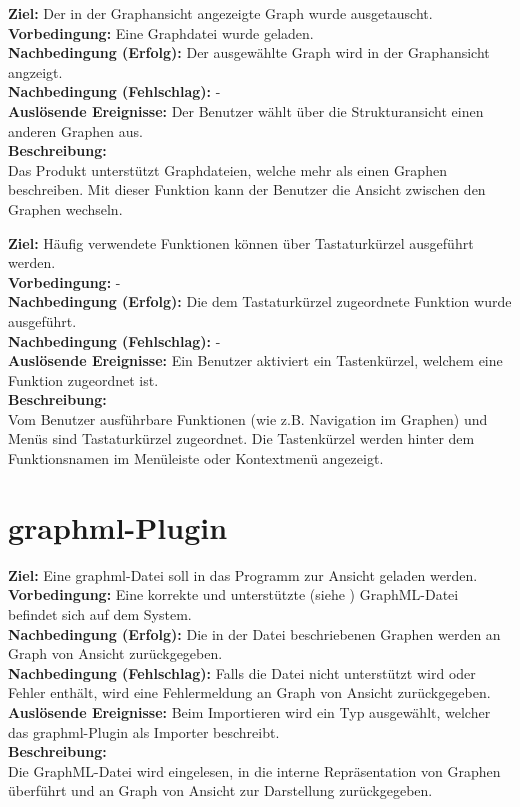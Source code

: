\label{fa:graphwechsel}
\textbf{Ziel:} Der in der Graphansicht angezeigte Graph wurde ausgetauscht. \\
\textbf{Vorbedingung:} Eine Graphdatei wurde geladen.\\
\textbf{Nachbedingung (Erfolg):} Der ausgewählte Graph wird in der Graphansicht angzeigt.\\
\textbf{Nachbedingung (Fehlschlag):} -\\
\textbf{Auslösende Ereignisse:}
Der Benutzer wählt über die Strukturansicht einen anderen Graphen aus.\\
\textbf{Beschreibung:}\\
Das Produkt unterstützt Graphdateien, welche mehr als einen Graphen beschreiben.
Mit dieser Funktion kann der Benutzer die Ansicht zwischen den Graphen wechseln.

\label{fa:hotkey}
\textbf{Ziel:} Häufig verwendete Funktionen können über Tastaturkürzel ausgeführt werden.\\
\textbf{Vorbedingung:} -\\
\textbf{Nachbedingung (Erfolg):} Die dem Tastaturkürzel zugeordnete Funktion wurde ausgeführt.\\
\textbf{Nachbedingung (Fehlschlag):} -\\
\textbf{Auslösende Ereignisse:}
Ein Benutzer aktiviert ein Tastenkürzel, welchem eine Funktion zugeordnet ist.\\
\textbf{Beschreibung:}\\
Vom Benutzer ausführbare Funktionen (wie z.B. Navigation im Graphen) und Menüs sind Tastaturkürzel zugeordnet.
Die Tastenkürzel werden hinter dem Funktionsnamen im Menüleiste oder Kontextmenü angezeigt.

\label{fa:speichern}
\label{fa:laden}

\section{\gls{graphml}-Plugin}
\setcounter{fanr}{300}

\label{fa:importgraphml}
\textbf{Ziel:} Eine \gls{graphml}-Datei soll in das Programm zur Ansicht geladen werden.\\
\textbf{Vorbedingung:} Eine korrekte und unterstützte (siehe ) GraphML-Datei befindet sich auf dem System.\\
\textbf{Nachbedingung (Erfolg):} Die in der Datei beschriebenen Graphen werden an Graph von Ansicht zurückgegeben.\\
\textbf{Nachbedingung (Fehlschlag):} Falls die Datei nicht unterstützt wird oder Fehler enthält, wird eine Fehlermeldung an Graph von Ansicht zurückgegeben.\\
\textbf{Auslösende Ereignisse:} Beim Importieren wird ein Typ ausgewählt, welcher das \gls{graphml}-Plugin als Importer beschreibt.\\
\textbf{Beschreibung:}\\
Die GraphML-Datei wird eingelesen, in die interne Repräsentation von Graphen überführt und an Graph von Ansicht zur Darstellung zurückgegeben.

